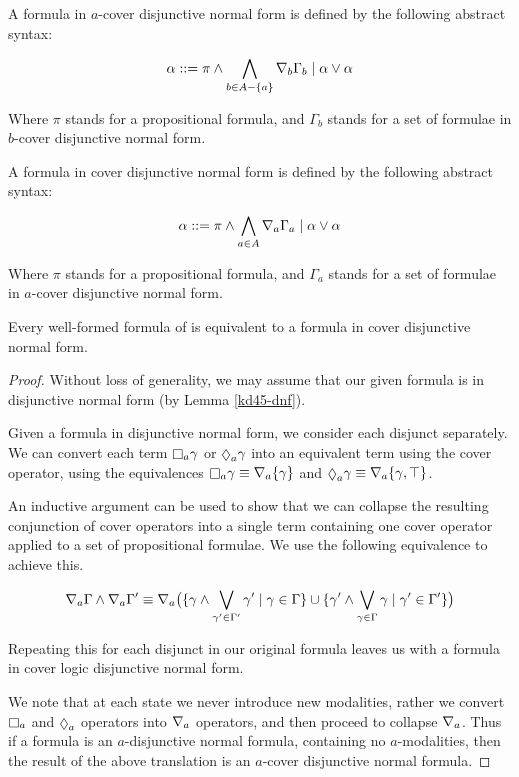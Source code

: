 \begin{definition}
A formula in $a$-cover disjunctive normal form is defined by the following
abstract syntax:

$$
\alpha ::= \pi \land \bigwedge_{b \in A - \{a\}} \nabla_b \Gamma_b \mid
\alpha \lor \alpha
$$

Where $\pi$ stands for a propositional formula, and $\Gamma_b$ stands for a set
of formulae in $b$-cover disjunctive normal form.

A formula in cover disjunctive normal form is defined by the following abstract
syntax:

$$
\alpha ::= \pi \land \bigwedge_{a \in A} \nabla_a \Gamma_a \mid
\alpha \lor \alpha
$$

Where $\pi$ stands for a propositional formula, and $\Gamma_a$ stands for a set
of formulae in $a$-cover disjunctive normal form.
\end{definition}

\begin{lemma}
Every well-formed formula of \logicKD{} is equivalent to a formula in
cover disjunctive normal form.
\end{lemma}

\begin{proof}
Without loss of generality, we may assume that our given formula is in
disjunctive normal form (by Lemma \ref{kd45-dnf}).

Given a formula in disjunctive normal form, we consider each disjunct separately. We
can convert each term $\knows_a \gamma$ or $\suspects_a \gamma$ into an equivalent
term using the cover operator, using the equivalences $\knows_a \gamma \equiv
\covers_a \{ \gamma \}$ and $\suspects_a \gamma \equiv \covers_a \{ \gamma, \top
\}$.

An inductive argument can be used to show that we can collapse the resulting
conjunction of cover operators into a single term containing one cover
operator applied to a set of propositional formulae. We use the following
equivalence to achieve this.

$$
\nabla_a \Gamma \land \nabla_a \Gamma' \equiv 
\nabla_a \big( 
\{ \gamma \land \bigvee_{\gamma' \in \Gamma'} \gamma' \mid \gamma \in \Gamma \}
\cup
\{ \gamma' \land \bigvee_{\gamma \in \Gamma} \gamma \mid \gamma' \in \Gamma' \}
\big)
$$

Repeating this for each disjunct in our original formula leaves us with a
formula in cover logic disjunctive normal form.

We note that at each state we never introduce new modalities, rather we convert
$\knows_a$ and $\suspects_a$ operators into $\nabla_a$ operators, and then
proceed to collapse $\nabla_a$. Thus if a formula is an $a$-disjunctive normal
formula, containing no $a$-modalities, then the result of the above translation
is an $a$-cover disjunctive normal formula.
\end{proof}

